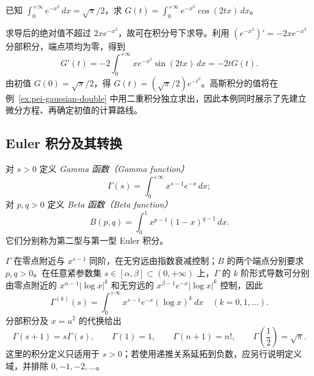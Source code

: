 \begin{example}
\label{ex:pei-gaussian-transform}
已知 $\int_0^{+\infty}e^{-x^2}\,dx=\sqrt\pi/2$，求
$G(t)=\int_0^{+\infty}e^{-x^2}\cos(2tx)\,dx$。
\end{example}
\begin{solve}
求导后的绝对值不超过 $2xe^{-x^2}$，故可在积分号下求导。利用 $(e^{-x^2})'=-2xe^{-x^2}$ 分部积分，端点项均为零，得到
\[
G'(t)=-2\int_0^{+\infty}xe^{-x^2}\sin(2tx)\,dx=-2tG(t).
\]
由初值 $G(0)=\sqrt\pi/2$，得 $G(t)=(\sqrt\pi/2)e^{-t^2}$。高斯积分的值将在例~\ref{ex:pei-gaussian-double} 中用二重积分独立求出，因此本例同时展示了先建立微分方程、再确定初值的计算路线。
\end{solve}

\subsection{Euler 积分及其转换}

\begin{definition}
\label{def:pei-euler-integrals}
对 $s>0$ 定义 \emph{Gamma 函数（Gamma function）}
\begin{equation}
\label{eq:pei-gamma-definition}
\Gamma(s)=\int_0^{+\infty}x^{s-1}e^{-x}\,dx;
\end{equation}
对 $p,q>0$ 定义 \emph{Beta 函数（Beta function）}
\begin{equation}
\label{eq:pei-beta-definition}
B(p,q)=\int_0^1x^{p-1}(1-x)^{q-1}\,dx.
\end{equation}
它们分别称为第二型与第一型 Euler 积分。
\end{definition}

$\Gamma$ 在零点附近与 $x^{s-1}$ 同阶，在无穷远由指数衰减控制；$B$ 的两个端点分别要求 $p,q>0$。在任意紧参数集 $s\in[\alpha,\beta]\subset(0,+\infty)$ 上，$\Gamma$ 的 $k$ 阶形式导数可分别由零点附近的 $x^{\alpha-1}|\log x|^k$ 和无穷远的 $x^{\beta-1}e^{-x}|\log x|^k$ 控制，因此
\[
\Gamma^{(k)}(s)=\int_0^{+\infty}x^{s-1}e^{-x}(\log x)^k\,dx
\quad(k=0,1,\ldots).
\]
分部积分及 $x=u^2$ 的代换给出
\[
\Gamma(s+1)=s\Gamma(s),\qquad
\Gamma(1)=1,\qquad \Gamma(n+1)=n!,\qquad
\Gamma\!\left(\frac12\right)=\sqrt\pi.
\]
这里的积分定义只适用于 $s>0$；若使用递推关系延拓到负数，应另行说明定义域，并排除 $0,-1,-2,\ldots$。

